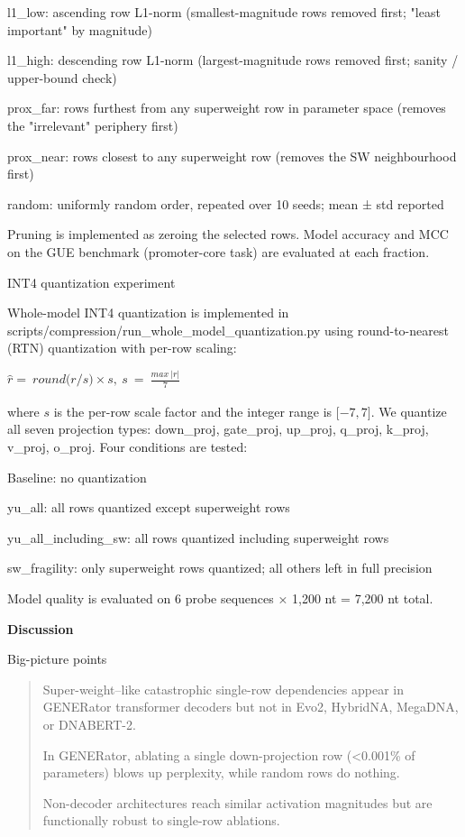 \documentclass[11pt]{article}
\begin{document}
l1\_low: ascending row L1-norm (smallest-magnitude rows removed first;
"least important" by magnitude)

l1\_high: descending row L1-norm (largest-magnitude rows removed first;
sanity / upper-bound check)

prox\_far: rows furthest from any superweight row in parameter space
(removes the "irrelevant" periphery first)

prox\_near: rows closest to any superweight row (removes the SW
neighbourhood first)

random: uniformly random order, repeated over 10 seeds; mean ± std
reported

Pruning is implemented as zeroing the selected rows. Model accuracy and
MCC on the GUE benchmark (promoter-core task) are evaluated at each
fraction.

INT4 quantization experiment

Whole-model INT4 quantization is implemented in
scripts/compression/run\_whole\_model\_quantization.py using
round-to-nearest (RTN) quantization with per-row scaling:

\(\widehat{r} = \ round(r/{s) \times s,\ s\  = \ \frac{max\ |r|}{7}}_{}\)

where \(s\) is the per-row scale factor and the integer range is
\(\lbrack - 7,7\rbrack\). We quantize all seven projection types:
down\_proj, gate\_proj, up\_proj, q\_proj, k\_proj, v\_proj, o\_proj.
Four conditions are tested:

Baseline: no quantization

yu\_all: all rows quantized except superweight rows

yu\_all\_including\_sw: all rows quantized including superweight rows

sw\_fragility: only superweight rows quantized; all others left in full
precision

Model quality is evaluated on 6 probe sequences × 1,200 nt = 7,200 nt
total.

\textbf{Discussion}

Big-picture points

\begin{quote}
Super-weight--like catastrophic single-row dependencies appear in
GENERator transformer decoders but not in Evo2, HybridNA, MegaDNA, or
DNABERT-2.

In GENERator, ablating a single down-projection row (\textless0.001\% of
parameters) blows up perplexity, while random rows do nothing.

Non-decoder architectures reach similar activation magnitudes but are
functionally robust to single-row ablations.
\end{quote}
\end{document}
